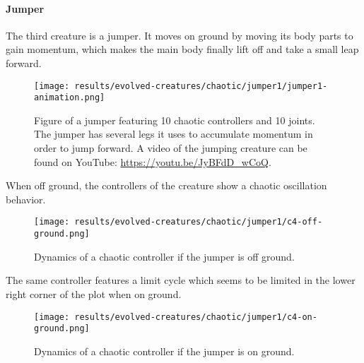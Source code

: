 \documentclass[main]{subfiles}
\begin{document}
\paragraph{Jumper}

The third creature is a jumper. It moves on ground by moving its body parts to gain momentum, which makes the main body finally lift off and take a small leap forward.

\begin{figure}[H]
\centering
\texttt{[image: results/evolved-creatures/chaotic/jumper1/jumper1-animation.png]}
\caption[Figure of a jumper using chaotic controllers.]{Figure of a jumper featuring 10 chaotic controllers and 10 joints. The jumper has several legs it uses to accumulate momentum in order to jump forward. A video of the jumping creature can be found on YouTube: \url{https://youtu.be/JyBFdD_wCoQ}.}
\label{figure:successfulcreatures-chaotic-crawler1}
\end{figure} 

When off ground, the controllers of the creature show a chaotic oscillation behavior. %

\begin{figure}[H]
\centering
\texttt{[image: results/evolved-creatures/chaotic/jumper1/c4-off-ground.png]}
\caption[Off ground controller dynamics of the crawler]{Dynamics of a chaotic controller if the jumper is off ground.}
\label{figure:crawler1-off-ground-controller-dynamics}
\end{figure}

The same controller features a limit cycle which seems to be limited in the lower right corner of the plot when on ground. %

\begin{figure}[H]
\centering
\texttt{[image: results/evolved-creatures/chaotic/jumper1/c4-on-ground.png]}
\caption[On ground controller dynamics of the crawler]{Dynamics of a chaotic controller if the jumper is on ground.}
\label{figure:crawler1-on-ground-controller-dynamics}
\end{figure}
\end{document}
